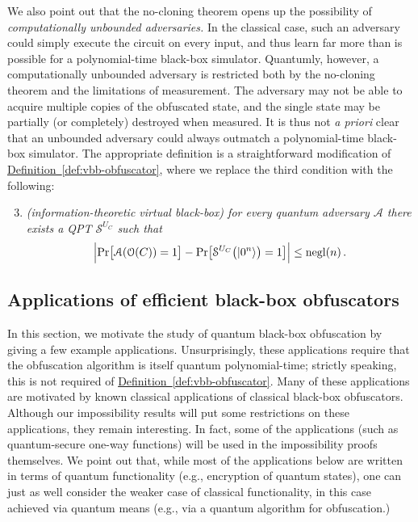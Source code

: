 \documentclass[envcountsame]{llncs}
\numberwithin{equation}{section}
\newcommand{\opn}{\operatorname}
\newcommand{\expref}[2]{\texorpdfstring{\hyperref[#2]{#1~\ref{#2}}}{#1~\ref{#2}}}
\newcommand{\negl}{\opn{negl}}
\newcommand{\prob}{\opn{Pr}}
\begin{document}
We also point out that the no-cloning theorem opens up the possibility of \emph{computationally unbounded adversaries.} In the classical case, such an adversary could simply execute the circuit on every input, and thus learn far more than is possible for a polynomial-time black-box simulator. Quantumly, however, a computationally unbounded adversary is restricted both by the no-cloning theorem and the limitations of measurement. The adversary may not be able to acquire multiple copies of the obfuscated state, and the single state may be partially (or completely) destroyed when measured. It is thus not \emph{a priori} clear that an unbounded adversary could always outmatch a polynomial-time black-box simulator. The appropriate definition is a straightforward modification of \expref{Definition}{def:vbb-obfuscator}, where we replace the third condition with the following:

\begin{enumerate}
\setcounter{enumi}{2}
\item \emph{(information-theoretic virtual black-box) for every quantum adversary $\mathcal A$ there exists a QPT $\mathcal S^{U_C}$ such that}
$$
\Bigl| \prob \bigl[\mathcal A(\mathcal O(C)) = 1\bigr] - \prob \bigl[\mathcal S^{U_C}\bigl(\ket{0^n}\bigr) = 1\bigr] \Bigr| \leq \negl(n)\,.
$$
\end{enumerate}

\subsection{Applications of efficient black-box obfuscators}\label{sec:vbb-applications}

In this section, we motivate the study of quantum black-box obfuscation by giving a few example applications. Unsurprisingly, these applications require that the obfuscation algorithm is itself quantum polynomial-time; strictly speaking, this is not required of \expref{Definition}{def:vbb-obfuscator}. Many of these applications are motivated by known classical applications of classical black-box obfuscators. Although our impossibility results will put some restrictions on these applications, they remain interesting. In fact, some of the applications (such as quantum-secure one-way functions) will be used in the impossibility proofs themselves. We point out that, while most of the applications below are written in terms of quantum functionality (e.g., encryption of quantum states), one can just as well consider the weaker case of classical functionality, in this case achieved via quantum means (e.g., via a quantum algorithm for obfuscation.)
\end{document}
